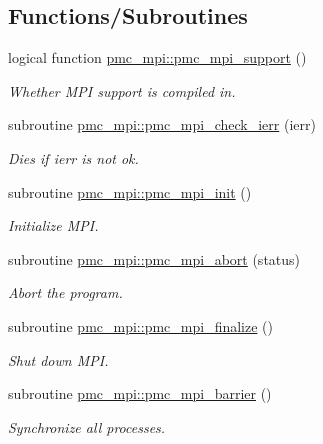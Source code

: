 \subsection*{Functions/\+Subroutines}
\begin{DoxyCompactItemize}
\item 
logical function \mbox{\hyperlink{namespacepmc__mpi_a3509026df8c8ae7c02e1d9b364f4a651}{pmc\+\_\+mpi\+::pmc\+\_\+mpi\+\_\+support}} ()
\begin{DoxyCompactList}\small\item\em Whether M\+PI support is compiled in. \end{DoxyCompactList}\item 
subroutine \mbox{\hyperlink{namespacepmc__mpi_af7b0af100baf65538aecee298e321e0c}{pmc\+\_\+mpi\+::pmc\+\_\+mpi\+\_\+check\+\_\+ierr}} (ierr)
\begin{DoxyCompactList}\small\item\em Dies if {\ttfamily ierr} is not ok. \end{DoxyCompactList}\item 
subroutine \mbox{\hyperlink{namespacepmc__mpi_a44c84d31a3ed394dc39113fb8232221f}{pmc\+\_\+mpi\+::pmc\+\_\+mpi\+\_\+init}} ()
\begin{DoxyCompactList}\small\item\em Initialize M\+PI. \end{DoxyCompactList}\item 
subroutine \mbox{\hyperlink{namespacepmc__mpi_a9b929bc85dfded58ac602697ab95ef42}{pmc\+\_\+mpi\+::pmc\+\_\+mpi\+\_\+abort}} (status)
\begin{DoxyCompactList}\small\item\em Abort the program. \end{DoxyCompactList}\item 
subroutine \mbox{\hyperlink{namespacepmc__mpi_a9c6189f38473985f2db47a9a6ecce869}{pmc\+\_\+mpi\+::pmc\+\_\+mpi\+\_\+finalize}} ()
\begin{DoxyCompactList}\small\item\em Shut down M\+PI. \end{DoxyCompactList}\item 
subroutine \mbox{\hyperlink{namespacepmc__mpi_aa6ae01b0c4da1bc58e67d3f0206812a8}{pmc\+\_\+mpi\+::pmc\+\_\+mpi\+\_\+barrier}} ()
\begin{DoxyCompactList}\small\item\em Synchronize all processes. \end{DoxyCompactList}\item 

\end{DoxyCompactItemize}
